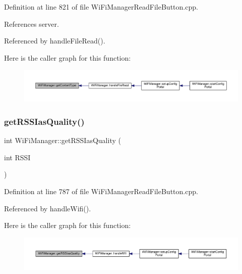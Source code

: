 Definition at line 821 of file Wi\+Fi\+Manager\+Read\+File\+Button.\+cpp.



References server.



Referenced by handle\+File\+Read().

Here is the caller graph for this function\+:\nopagebreak
\begin{figure}[H]
\begin{center}
\leavevmode
\includegraphics[width=350pt]{d4/dc8/class_wi_fi_manager_a40f123fd290c3e331c9785d19a88f3b8_icgraph}
\end{center}
\end{figure}
\mbox{\label{class_wi_fi_manager_ae71cfd6bd70ada2ca02e1d20b152d0e5}} 
\subsubsection{\texorpdfstring{get\+R\+S\+S\+Ias\+Quality()}{getRSSIasQuality()}}
{\footnotesize\ttfamily int Wi\+Fi\+Manager\+::get\+R\+S\+S\+Ias\+Quality (\begin{DoxyParamCaption}\item[{int}]{R\+S\+SI }\end{DoxyParamCaption})\hspace{0.3cm}{\ttfamily [private]}}



Definition at line 787 of file Wi\+Fi\+Manager\+Read\+File\+Button.\+cpp.



Referenced by handle\+Wifi().

Here is the caller graph for this function\+:\nopagebreak
\begin{figure}[H]
\begin{center}
\leavevmode
\includegraphics[width=350pt]{d4/dc8/class_wi_fi_manager_ae71cfd6bd70ada2ca02e1d20b152d0e5_icgraph}
\end{center}
\end{figure}
\mbox{\label{class_wi_fi_manager_a9c78a8774f746ec22a99d03a53baa607}} 
